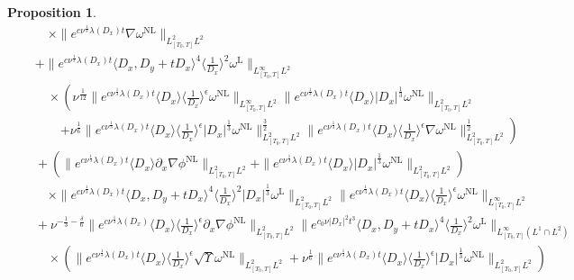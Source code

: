 \documentclass[reqno, 12pt]{amsart} %
\theoremstyle{plain} %
\newtheorem{Prop}[Thm]{Proposition}
\theoremstyle{definition}
\theoremstyle{remark}
\numberwithin{equation}{section} %
\newcommand{\lt}{\left}
\newcommand{\rt}{\right}
\begin{document}
\begin{Prop}
{\begin{align*}
				&\qquad \times \|e^{c \nu^{\frac{1}{3}} \lambda\left(D_x\right) t} \nabla \omega^{\mathrm{NL}} \|_{L_{[T_0, T]}^2 L^2} \\
				&\quad +      \|e^{c \nu^{\frac{1}{3}} \lambda\left(D_x\right) t}\langle D_x, D_y+t D_x\rangle^4\langle\frac{1}{D_x}\rangle^2 \omega^{\mathrm{L}}\|_{L_{[T_0, T]}^\infty L^2} \\
				& \qquad \times \left(  \nu^{\frac{1}{12}}\|e^{c \nu^{\frac{1}{3}} \lambda\left(D_x\right) t}\langle D_x\rangle\langle\frac{1}{D_x}\rangle^\epsilon \omega^{\mathrm{NL}}\|_{L_{[T_0, T]}^\infty L^2}  \| e^{c \nu^{\frac{1}{3}} \lambda\left(D_x\right) t} \langle D_x \rangle
				\left|D_x\right|^{\frac{1}{3}}  \omega^{\mathrm{NL}} \|_{L_{[T_0, T]}^2 L^2} \rt.\\
				&\qquad \quad  \lt.+ \nu^{\frac{1}{6}} \|e^{c \nu^{\frac{1}{3}} \lambda\left(D_x\right) t}\langle D_x\rangle\langle\frac{1}{D_x}\rangle^\epsilon\left|D_x\right|^{\frac{1}{3}}  \omega^{\mathrm{NL}}\|_{L_{[T_0, T]}^2 L^2}^{\frac{3}{2}}   \|e^{c \nu^{\frac{1}{3}} \lambda\left(D_x\right) t}\langle D_x\rangle\langle\frac{1}{D_x}\rangle^\epsilon \nabla   \omega^{\mathrm{NL}}\|_{L_{[T_0, T]}^2 L^2}^{\frac{1}{2}}\right) \\
				&\quad+  \lt( \|e^{c \nu^{\frac{1}{3}} \lambda\left(D_x\right) t}\langle D_x\rangle \partial_x \nabla \phi^{\mathrm{NL}}\|_{L_{[T_0, T]}^2 L^2} + \|e^{c \nu^{\frac{1}{3}} \lambda\left(D_x\right) t}\langle D_x\rangle\left|D_x\right|^{\frac{1}{3}} \omega^{\mathrm{NL}}\|_{L_{[T_0, T]}^2 L^2} \rt) \\
				&  \qquad \times\|e^{c \nu^{\frac{1}{3}} \lambda\left(D_x\right) t}\langle D_x, D_y+t D_x\rangle^4\langle\frac{1}{D_x}\rangle^2\left|D_x\right|^{\frac{1}{3}} \omega^{\mathrm{L}}\|_{L_{[T_0, T]}^2 L^2} \|e^{c \nu^{\frac{1}{3}} \lambda\left(D_x\right) t}\langle D_x\rangle  \langle\frac{1}{D_x}\rangle^\epsilon \omega^{\mathrm{NL}}\|_{L_{[T_0, T]}^\infty L^2} \\
				& \quad  + \nu^{-\frac{1}{3}-\frac{\delta}{6}}\|e^{c \nu^{\frac{1}{3}} \lambda\left(D_x\right)}\langle D_x\rangle\langle\frac{1}{D_x}\rangle^\epsilon \partial_x \nabla \phi^{\mathrm{NL}}\|_{L_{[T_0, T]}^2 L^2}\|e^{c_0 \nu\left|D_x\right|^2 t^3}\langle D_x, D_y+t D_x\rangle^4\langle\frac{1}{D_x}\rangle^2 \omega^{\mathrm{L}}\|_{L_{[T_0, T]}^\infty (L^1 \cap L^2)} \\
				&\qquad  \times\left(\|e^{c \nu^{\frac{1}{3}} \lambda\left(D_x\right) t}\langle D_x\rangle\langle\frac{1}{D_x}\rangle^\epsilon \sqrt{\Upsilon} \omega^{\mathrm{NL}}\|_{L_{[T_0, T]}^2L^2}+\nu^{\frac{1}{6}}\|e^{c \nu^{\frac{1}{3}} \lambda\left(D_x\right) t}\langle D_x\rangle\langle\frac{1}{D_x}\rangle^\epsilon |D_x|^\frac13 \omega^{\mathrm{NL}}\|_{L_{[T_0, T]}^2L^2}\right) \\

\end{align*}}
\end{Prop}
\end{document}
